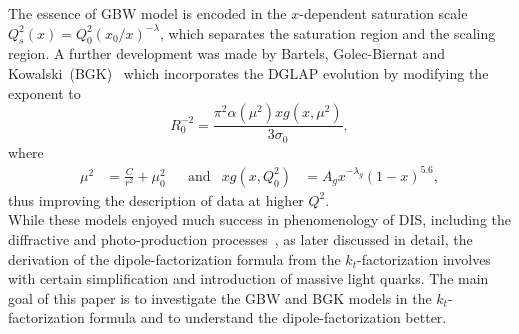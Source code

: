 \documentclass[11pt]{article}
\numberwithin{equation}{section}
\numberwithin{table}{section}
\numberwithin{figure}{section}
\begin{document}
The essence of GBW model is encoded in the $x$-dependent saturation scale $Q_s^2(x)=Q^2_0(x_0/x)^{-\lambda}$, which separates the saturation region and the scaling region.
A further development was made by Bartels, Golec-Biernat and Kowalski~(BGK)~\cite{Bartels:2002cj} which incorporates the DGLAP evolution by modifying the exponent to 
\begin{equation}
R_0^{-2}=\frac{\pi^2\alpha(\mu^2)xg(x,\mu^2)}{3\sigma_0},
\end{equation}
where
\begin{align}
\mu^2&=\frac{C}{r^2}+\mu_0^2 & &\mathrm{and} & xg(x,Q^2_0)&=A_g x^{-\lambda_g}(1-x)^{5.6},
\end{align}
thus improving the description of data at higher $Q^2$.\\
While these models enjoyed much success in phenomenology of DIS, including the diffractive and photo-production processes~\cite{Golec-Biernat:1998zce,Golec-Biernat:1999qor}, as later discussed in detail, the derivation of the dipole-factorization formula from the $k_t$-factorization involves with certain simplification and introduction of massive light quarks. The main goal of this paper is to investigate the GBW and BGK models in the $k_t$-factorization formula and to understand the dipole-factorization better. 
\end{document}
